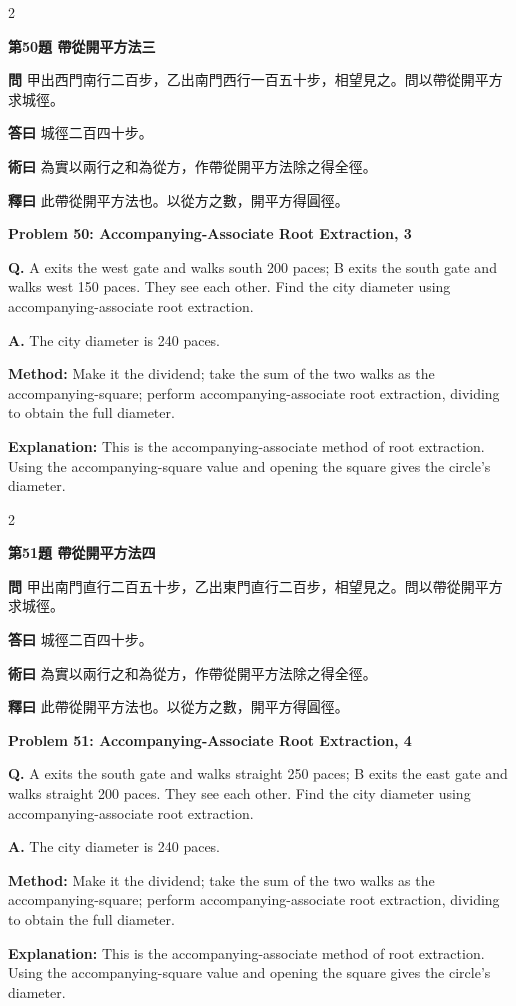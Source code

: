\documentclass[11pt,a4paper]{article}
\newcommand{\wen}[1]{\noindent\textbf{問} #1\par\smallskip}
\newcommand{\da}[1]{\noindent\textbf{答曰} #1\par\smallskip}
\newcommand{\shu}[1]{\noindent\textbf{術曰} #1\par\smallskip}
\newcommand{\shi}[1]{\noindent\textbf{釋曰} #1\par\smallskip}
\newcommand{\wenE}[1]{\noindent\textbf{Q.} #1\par\smallskip}
\newcommand{\daE}[1]{\noindent\textbf{A.} #1\par\smallskip}
\newcommand{\shuE}[1]{\noindent\textbf{Method:} #1\par\smallskip}
\newcommand{\shiE}[1]{\noindent\textbf{Explanation:} #1\par\smallskip}
\begin{document}
\bigskip

\begin{paracol}{2}

\noindent\textbf{第50題 帶從開平方法三}

\wen{甲出西門南行二百步，乙出南門西行一百五十步，相望見之。問以帶從開平方求城徑。}
\da{城徑二百四十步。}
\shu{為實以兩行之和為從方，作帶從開平方法除之得全徑。}
\shi{此帶從開平方法也。以從方之數，開平方得圓徑。}

\switchcolumn

\noindent\textbf{Problem 50: Accompanying-Associate Root Extraction, 3}

\wenE{A exits the west gate and walks south 200 paces; B exits the south gate and walks west 150 paces. They see each other. Find the city diameter using accompanying-associate root extraction.}
\daE{The city diameter is 240 paces.}
\shuE{Make it the dividend; take the sum of the two walks as the accompanying-square; perform accompanying-associate root extraction, dividing to obtain the full diameter.}
\shiE{This is the accompanying-associate method of root extraction. Using the accompanying-square value and opening the square gives the circle's diameter.}

\end{paracol}

\bigskip

\begin{paracol}{2}

\noindent\textbf{第51題 帶從開平方法四}

\wen{甲出南門直行二百五十步，乙出東門直行二百步，相望見之。問以帶從開平方求城徑。}
\da{城徑二百四十步。}
\shu{為實以兩行之和為從方，作帶從開平方法除之得全徑。}
\shi{此帶從開平方法也。以從方之數，開平方得圓徑。}

\switchcolumn

\noindent\textbf{Problem 51: Accompanying-Associate Root Extraction, 4}

\wenE{A exits the south gate and walks straight 250 paces; B exits the east gate and walks straight 200 paces. They see each other. Find the city diameter using accompanying-associate root extraction.}
\daE{The city diameter is 240 paces.}
\shuE{Make it the dividend; take the sum of the two walks as the accompanying-square; perform accompanying-associate root extraction, dividing to obtain the full diameter.}
\shiE{This is the accompanying-associate method of root extraction. Using the accompanying-square value and opening the square gives the circle's diameter.}

\end{paracol}
\end{document}
